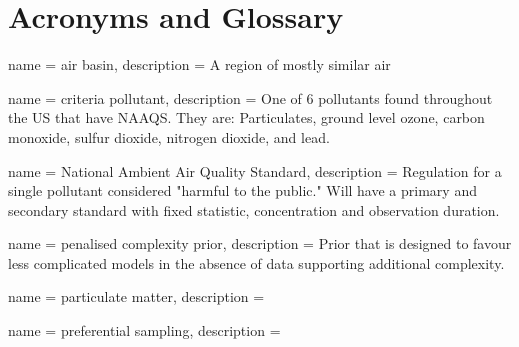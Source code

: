 \section*{Acronyms and Glossary}


{
    name = {air basin},
    description = {A region of mostly similar air}
}

{
    name = {criteria pollutant},
    description = {One of 6 pollutants found throughout the US that have NAAQS.  They are: Particulates, ground level ozone, carbon monoxide, sulfur dioxide, nitrogen dioxide, and lead.}
}

{
    name = {National Ambient Air Quality Standard},
    description = {Regulation for a single pollutant considered "harmful to the public." Will have a primary and secondary standard with fixed statistic, concentration and observation duration. }
}

{
    name = {penalised complexity prior},
    description = {Prior that is designed to favour less complicated models in the absence of data supporting additional complexity. \cite{simpson2017penalising} }
}

{
    name = {particulate matter},
    description = {}
}

{
    name = {preferential sampling},
    description = {}
}



